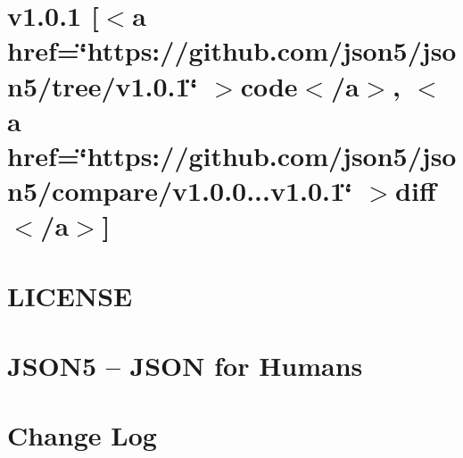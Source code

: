 \documentclass[twoside]{book}
\newcommand{\+}{\discretionary{\mbox{\scriptsize$\hookleftarrow$}}{}{}}
\begin{document}
\chapter{v1.0.1 \mbox{[}\texorpdfstring{$<$}{<}a href=\char`\"{}https\+://github.\+com/json5/json5/tree/v1.\+0.\+1\char`\"{} \texorpdfstring{$>$}{>}code\texorpdfstring{$<$}{<}/a\texorpdfstring{$>$}{>}, \texorpdfstring{$<$}{<}a href=\char`\"{}https\+://github.\+com/json5/json5/compare/v1.\+0.\+0...\+v1.\+0.\+1\char`\"{} \texorpdfstring{$>$}{>}diff\texorpdfstring{$<$}{<}/a\texorpdfstring{$>$}{>}\mbox{]}}
\label{md__c___users_vaishnavi_jadhav__desktop__developer_code_mean_stack_example_client_node_modules_bf61e4026d607a858b74d307f85f53dce}

\chapter{LICENSE}
\label{md__c___users_vaishnavi_jadhav__desktop__developer_code_mean_stack_example_client_node_modules_b22a16ff97b935c16a5a7829ad56a4eff}

\chapter{JSON5 – JSON for Humans}
\label{md__c___users_vaishnavi_jadhav__desktop__developer_code_mean_stack_example_client_node_modules_b714a308b9e589456ffd72a20a712297e}

\chapter{Change Log}
\label{md__c___users_vaishnavi_jadhav__desktop__developer_code_mean_stack_example_client_node_modules_b6be6d82cba7788993ec21419f1b2cf89}

\end{document}
